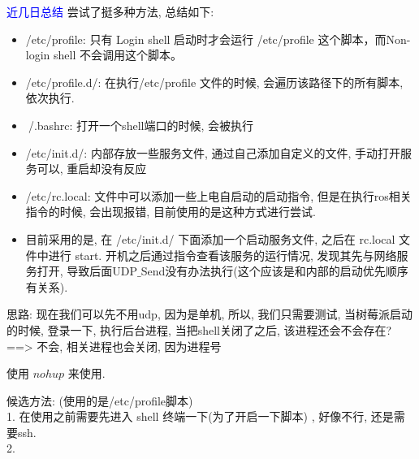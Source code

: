 \textcolor{blue}{近几日总结} 尝试了挺多种方法, 总结如下:
\begin{itemize}
    \item /etc/profile: 只有 Login shell 启动时才会运行 /etc/profile 这个脚本，而Non-login shell 不会调用这个脚本。
    \item /etc/profile.d/: 在执行/etc/profile 文件的时候, 会遍历该路径下的所有脚本, 依次执行. 
    \item $~$/.bashrc: 打开一个shell端口的时候, 会被执行
    \item /etc/init.d/: 内部存放一些服务文件, 通过自己添加自定义的文件, 手动打开服务可以, 重启却没有反应
    \item /etc/rc.local: 文件中可以添加一些上电自启动的启动指令, 但是在执行ros相关指令的时候, 会出现报错, 目前使用的是这种方式进行尝试. 
    \item 目前采用的是, 在 /etc/init.d/ 下面添加一个启动服务文件, 之后在 rc.local 文件中进行 start. 开机之后通过指令查看该服务的运行情况, 发现其先与网络服务打开, 导致后面UDP$\_$Send没有办法执行(这个应该是和内部的启动优先顺序有关系). 
\end{itemize}

思路: 现在我们可以先不用udp, 因为是单机, 所以, 我们只需要测试, 
当树莓派启动的时候, 登录一下, 执行后台进程, 当把shell关闭了之后, 该进程还会不会存在? ==> 不会, 相关进程也会关闭, 因为进程号

使用 $nohup$ 来使用. \par
候选方法: (使用的是/etc/profile脚本)\\
1. 在使用之前需要先进入 shell 终端一下(为了开启一下脚本) , 好像不行, 还是需要ssh. \\
2. 

